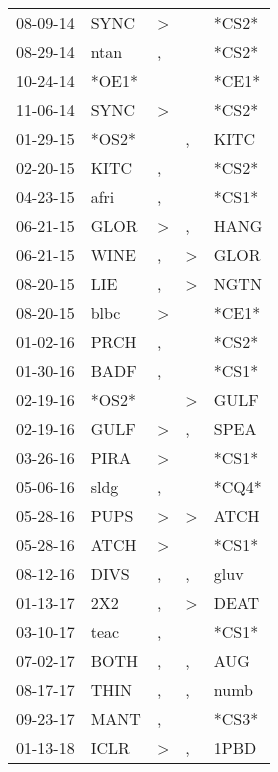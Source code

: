 \begin{supertabular}{lllll}
 08-09-14 &   SYNC &  \textgreater &               &  *CS2* \\
 08-29-14 &   ntan &             , &               &  *CS2* \\
 10-24-14 &  *OE1* &               &               &  *CE1* \\
 11-06-14 &   SYNC &  \textgreater &               &  *CS2* \\
 01-29-15 &  *OS2* &               &             , &   KITC \\
 02-20-15 &   KITC &             , &               &  *CS2* \\
 04-23-15 &   afri &             , &               &  *CS1* \\
 06-21-15 &   GLOR &  \textgreater &             , &   HANG \\
 06-21-15 &   WINE &             , &  \textgreater &   GLOR \\
 08-20-15 &    LIE &             , &  \textgreater &   NGTN \\
 08-20-15 &   blbc &  \textgreater &               &  *CE1* \\
 01-02-16 &   PRCH &             , &               &  *CS2* \\
 01-30-16 &   BADF &             , &               &  *CS1* \\
 02-19-16 &  *OS2* &               &  \textgreater &   GULF \\
 02-19-16 &   GULF &  \textgreater &             , &   SPEA \\
 03-26-16 &   PIRA &  \textgreater &               &  *CS1* \\
 05-06-16 &   sldg &             , &               &  *CQ4* \\
 05-28-16 &   PUPS &  \textgreater &  \textgreater &   ATCH \\
 05-28-16 &   ATCH &  \textgreater &               &  *CS1* \\
 08-12-16 &   DIVS &             , &             , &   gluv \\
 01-13-17 &    2X2 &             , &  \textgreater &   DEAT \\
 03-10-17 &   teac &             , &               &  *CS1* \\
 07-02-17 &   BOTH &             , &             , &    AUG \\
 08-17-17 &   THIN &             , &             , &   numb \\
 09-23-17 &   MANT &             , &               &  *CS3* \\
 01-13-18 &   ICLR &  \textgreater &             , &   1PBD \\

\end{supertabular}

